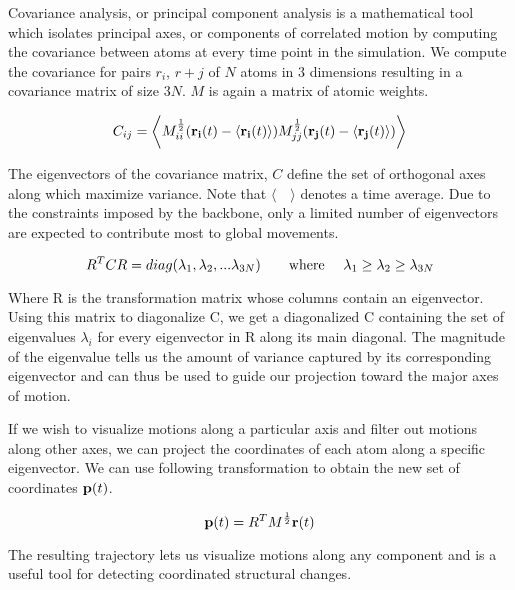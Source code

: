 Covariance analysis, or principal component analysis is a mathematical tool which isolates principal axes, or components of correlated motion by computing the covariance between atoms at every time point in the simulation. We compute the covariance for pairs $r_i$, $r+j$ of $N$ atoms  in $3$ dimensions resulting in a covariance matrix of size $3N$. $M$ is again a matrix of atomic weights.


\begin{equation}
C_{ij} = \bigg\langle M_{ii}^{\frac{1}{2}} (\mathbf{r_i}(t) - \langle \mathbf{r_i}(t) \rangle) M_{jj}^{\frac{1}{2}} (\mathbf{r_j}(t) - \langle \mathbf{r_j}(t) \rangle) \bigg\rangle
\end{equation}

The eigenvectors of the covariance matrix, $C$ define the set of orthogonal axes along which maximize variance. Note that $\langle \quad \rangle$ denotes a time average. Due to the constraints imposed by the backbone, only a limited number of eigenvectors are expected to contribute most to global movements.

\begin{equation}
R^{T}CR = diag(\lambda_1, \lambda_2, ... \lambda_{3N}) \text{\qquad where \quad} \lambda_1 \geq \lambda_2 \geq \lambda_{3N}
\end{equation}

Where R is the transformation matrix whose columns contain an eigenvector. Using this matrix to diagonalize C, we get a diagonalized C containing the set of eigenvalues $\lambda_i$ for every eigenvector in R along its main diagonal. The magnitude of the eigenvalue tells us the amount of variance captured by its corresponding eigenvector and can thus be used to guide our projection toward the major axes of motion.

If we wish to visualize motions along a particular axis and filter out motions along other axes, we can project the coordinates of each atom along a specific eigenvector. We can use following transformation to obtain the new set of coordinates $\mathbf{p}(t)$.

\begin{equation}
\mathbf{p}(t) = R^{T}M^{\frac{1}{2}}\mathbf{r}(t)
\end{equation}

The resulting trajectory lets us visualize motions along any component and is a useful tool for detecting coordinated structural changes. 

